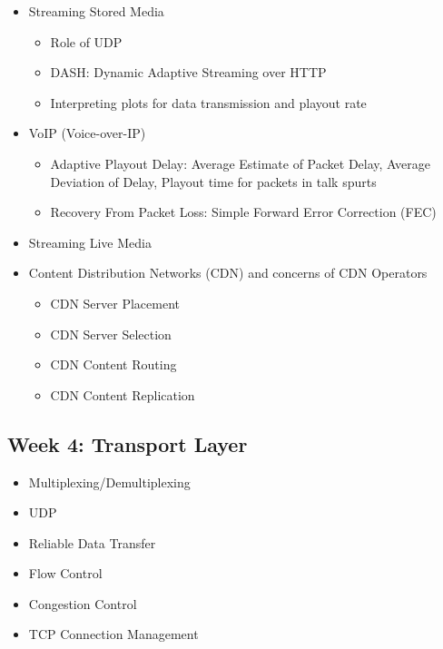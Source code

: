 \documentclass[a4paper]{article}
\begin{document}
\begin{itemize}[label=$\square$]
    \item Streaming Stored Media
    \begin{itemize}[label=$\square$]
        \item Role of UDP
        \item DASH: Dynamic Adaptive Streaming over HTTP
        \item Interpreting plots for data transmission and playout rate
    \end{itemize}
    \item VoIP (Voice-over-IP)
    \begin{itemize}[label=$\square$]
        \item Adaptive Playout Delay: Average Estimate of Packet Delay, Average Deviation of Delay, Playout time for packets in talk spurts
        \item Recovery From Packet Loss: Simple Forward Error Correction (FEC)    
    \end{itemize}
    \item Streaming Live Media
    \item Content Distribution Networks (CDN) and concerns of CDN Operators
    \begin{itemize}[label=$\square$]
        \item CDN Server Placement
        \item CDN Server Selection
        \item CDN Content Routing
        \item CDN Content Replication
    \end{itemize}
\end{itemize}

\newpage
\subsection*{Week 4: Transport Layer}

\begin{itemize}[label=$\square$]
    \item Multiplexing/Demultiplexing
    \item UDP
    \item Reliable Data Transfer
    \item Flow Control
    \item Congestion Control
    \item TCP Connection Management
\end{itemize}
\end{document}
